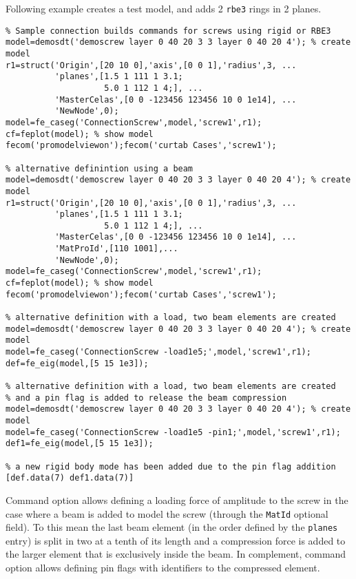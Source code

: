 \begin{SDT}
Following example creates a test model, and adds 2 {\tt rbe3} rings in 2 planes.

\begin{verbatim}
% Sample connection builds commands for screws using rigid or RBE3
model=demosdt('demoscrew layer 0 40 20 3 3 layer 0 40 20 4'); % create model
r1=struct('Origin',[20 10 0],'axis',[0 0 1],'radius',3, ...
          'planes',[1.5 1 111 1 3.1;
                    5.0 1 112 1 4;], ...
          'MasterCelas',[0 0 -123456 123456 10 0 1e14], ...
          'NewNode',0);
model=fe_caseg('ConnectionScrew',model,'screw1',r1);
cf=feplot(model); % show model 
fecom('promodelviewon');fecom('curtab Cases','screw1');

% alternative definintion using a beam
model=demosdt('demoscrew layer 0 40 20 3 3 layer 0 40 20 4'); % create model
r1=struct('Origin',[20 10 0],'axis',[0 0 1],'radius',3, ...
          'planes',[1.5 1 111 1 3.1;
                    5.0 1 112 1 4;], ...
          'MasterCelas',[0 0 -123456 123456 10 0 1e14], ...
          'MatProId',[110 1001],...
          'NewNode',0);
model=fe_caseg('ConnectionScrew',model,'screw1',r1);
cf=feplot(model); % show model 
fecom('promodelviewon');fecom('curtab Cases','screw1');

% alternative definition with a load, two beam elements are created
model=demosdt('demoscrew layer 0 40 20 3 3 layer 0 40 20 4'); % create model
model=fe_caseg('ConnectionScrew -load1e5;',model,'screw1',r1);
def=fe_eig(model,[5 15 1e3]);

% alternative definition with a load, two beam elements are created
% and a pin flag is added to release the beam compression
model=demosdt('demoscrew layer 0 40 20 3 3 layer 0 40 20 4'); % create model
model=fe_caseg('ConnectionScrew -load1e5 -pin1;',model,'screw1',r1);
def1=fe_eig(model,[5 15 1e3]);

% a new rigid body mode has been added due to the pin flag addition
[def.data(7) def1.data(7)]
\end{verbatim}%

\vs

Command option  allows defining a loading force of amplitude  to the screw in the case where a beam is added to model the screw (through the {\tt MatId} optional field). To this mean the last beam element (in the order defined by the {\tt planes} entry) is split in two at a tenth of its length and a compression force is added to the larger element that is exclusively inside the beam. In complement, command option  allows defining pin flags with identifiers  to the compressed \beam element.


\end{SDT}

